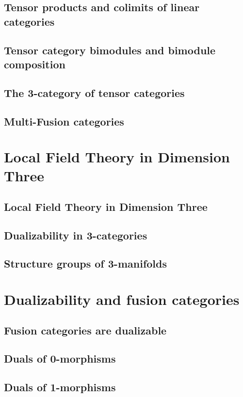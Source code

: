 \documentclass{amsart}
\begin{document}
\subsection{Tensor products and colimits of linear categories}
\subsection{Tensor category bimodules and bimodule composition}
\subsection{The 3-category of tensor categories}
\subsection{Multi-Fusion categories}



\section{Local Field Theory in Dimension Three}

\subsection{Local Field Theory in Dimension Three}
\subsection{Dualizability in 3-categories}
\subsection{Structure groups of 3-manifolds}



\section{Dualizability and fusion categories}
\subsection{Fusion categories are dualizable}
\subsection{Duals of 0-morphisms}
\subsection{Duals of 1-morphisms}
\end{document}
